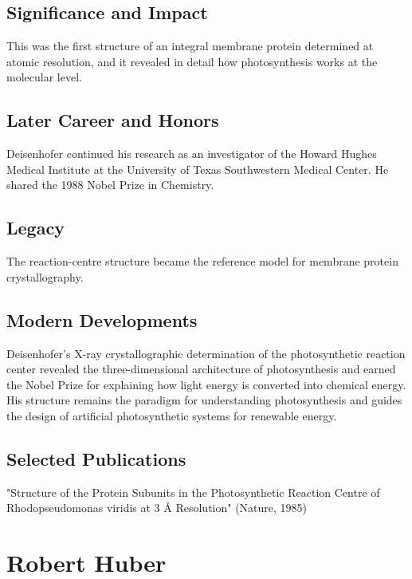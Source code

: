 \subsection*{Significance and Impact}

This was the first structure of an integral membrane protein determined at atomic resolution, and it revealed in detail how photosynthesis works at the molecular level.

\subsection*{Later Career and Honors}

Deisenhofer continued his research as an investigator of the Howard Hughes Medical Institute at the University of Texas Southwestern Medical Center. He shared the 1988 Nobel Prize in Chemistry.

\subsection*{Legacy}

The reaction-centre structure became the reference model for membrane protein crystallography.

\subsection*{Modern Developments}

Deisenhofer's X-ray crystallographic determination of the photosynthetic reaction center revealed the three-dimensional architecture of photosynthesis and earned the Nobel Prize for explaining how light energy is converted into chemical energy. His structure remains the paradigm for understanding photosynthesis and guides the design of artificial photosynthetic systems for renewable energy.

\subsection*{Selected Publications}

"Structure of the Protein Subunits in the Photosynthetic Reaction Centre of Rhodopseudomonas viridis at 3 Å Resolution" (Nature, 1985)

\clearpage

\section{Robert Huber}


